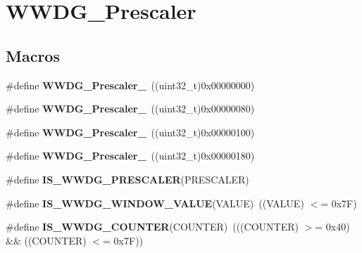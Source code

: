 \hypertarget{group___w_w_d_g___prescaler}{\section{W\-W\-D\-G\-\_\-\-Prescaler}
\label{group___w_w_d_g___prescaler}
}
\subsection*{Macros}
\begin{DoxyCompactItemize}
\item 
\hypertarget{group___w_w_d_g___prescaler_ga55780dcf60a252724f5aae2ca37d91c5}{\#define {\bfseries W\-W\-D\-G\-\_\-\-Prescaler\-\_}~((uint32\-\_\-t)0x00000000)}\label{group___w_w_d_g___prescaler_ga55780dcf60a252724f5aae2ca37d91c5}

\item 
\hypertarget{group___w_w_d_g___prescaler_ga2ac67d0a7f8691b5ebf0d7d77d6b5f08}{\#define {\bfseries W\-W\-D\-G\-\_\-\-Prescaler\-\_}~((uint32\-\_\-t)0x00000080)}\label{group___w_w_d_g___prescaler_ga2ac67d0a7f8691b5ebf0d7d77d6b5f08}

\item 
\hypertarget{group___w_w_d_g___prescaler_gab11714e1816967802a8421587e54a2eb}{\#define {\bfseries W\-W\-D\-G\-\_\-\-Prescaler\-\_}~((uint32\-\_\-t)0x00000100)}\label{group___w_w_d_g___prescaler_gab11714e1816967802a8421587e54a2eb}

\item 
\hypertarget{group___w_w_d_g___prescaler_ga7a4933366603869726bd5ea547d99f02}{\#define {\bfseries W\-W\-D\-G\-\_\-\-Prescaler\-\_}~((uint32\-\_\-t)0x00000180)}\label{group___w_w_d_g___prescaler_ga7a4933366603869726bd5ea547d99f02}

\item 
\#define {\bfseries I\-S\-\_\-\-W\-W\-D\-G\-\_\-\-P\-R\-E\-S\-C\-A\-L\-E\-R}(P\-R\-E\-S\-C\-A\-L\-E\-R)
\item 
\hypertarget{group___w_w_d_g___prescaler_gab6ea714a2380b7d6547ba97363887868}{\#define {\bfseries I\-S\-\_\-\-W\-W\-D\-G\-\_\-\-W\-I\-N\-D\-O\-W\-\_\-\-V\-A\-L\-U\-E}(V\-A\-L\-U\-E)~((V\-A\-L\-U\-E) $<$= 0x7\-F)}\label{group___w_w_d_g___prescaler_gab6ea714a2380b7d6547ba97363887868}

\item 
\hypertarget{group___w_w_d_g___prescaler_ga4728877128cd60494692d8f14389112e}{\#define {\bfseries I\-S\-\_\-\-W\-W\-D\-G\-\_\-\-C\-O\-U\-N\-T\-E\-R}(C\-O\-U\-N\-T\-E\-R)~(((C\-O\-U\-N\-T\-E\-R) $>$= 0x40) \&\& ((\-C\-O\-U\-N\-T\-E\-R) $<$= 0x7\-F))}\label{group___w_w_d_g___prescaler_ga4728877128cd60494692d8f14389112e}

\end{DoxyCompactItemize}


